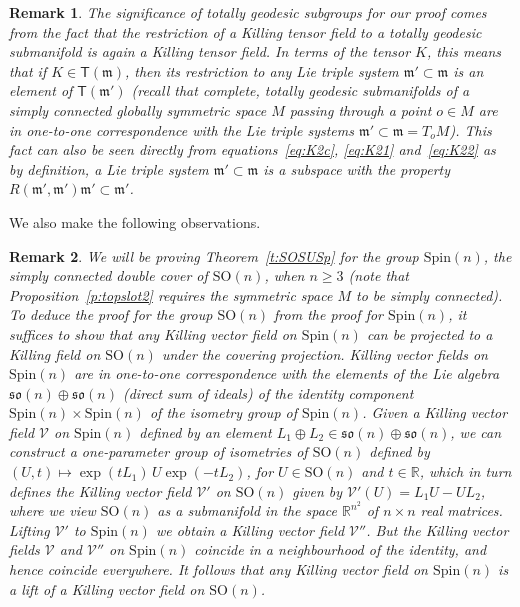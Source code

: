 \documentclass[10pt,a4paper]{amsart}
\newcommand \br{\mathbb{R}}
\newcommand \SO{\mathrm{SO}}
\newcommand \Spin{\mathrm{Spin}}
\newcommand \cV{\mathcal{V}}
\newcommand \sT{\mathsf{T}}
\newcommand\m{\mathfrak m}
\newcommand \so{\mathfrak{so}}
\newcommand \<{\langle}
\renewcommand \>{\rangle}
\newtheorem{remark}{Remark}
\begin{document}
	\begin{remark} \label{rem:lts}
		The significance of totally geodesic subgroups for our proof comes from the fact that the restriction of a Killing tensor field to a totally geodesic submanifold is again a Killing tensor field. In terms of the tensor $K$, this means that if $K \in \sT(\m)$, then its restriction to any Lie triple system $\m' \subset \m$ is an element of $\sT(\m')$ (recall that complete, totally geodesic submanifolds of a simply connected globally symmetric space $M$ passing through a point $o \in M$ are in one-to-one correspondence with the Lie triple systems $\m' \subset \m = T_oM$). This fact can also be seen directly from equations~\eqref{eq:K2c}, \eqref{eq:K21} and~\eqref{eq:K22} as by definition, a Lie triple system $\m' \subset \m$ is a subspace with the property $R(\m',\m')\m' \subset \m'$.
	\end{remark}
	
We also make the following observations.
	
	\begin{remark} \label{rem:spintoso}
		We will be proving Theorem~\ref{t:SOSUSp} for the group $\Spin(n)$, the simply connected double cover of $\SO(n)$, when $n \ge 3$ (note that Proposition~\ref{p:topslot2} requires the symmetric space $M$ to be simply connected). To deduce the proof for the group $\SO(n)$ from the proof for $\Spin(n)$, it suffices to show that any Killing vector field on $\Spin(n)$ can be projected to a Killing field on $\SO(n)$ under the covering projection. Killing vector fields on $\Spin(n)$ are in one-to-one correspondence with the elements of the Lie algebra $\so(n) \oplus \so(n)$ (direct sum of ideals) of the identity component $\Spin(n) \times \Spin(n)$ of the isometry group of $\Spin(n)$. Given a Killing vector field $\cV$ on $\Spin(n)$ defined by an element $L_1 \oplus L_2 \in \so(n) \oplus \so(n)$, we can construct a one-parameter group of isometries of $\SO(n)$ defined by $(U,t) \mapsto \exp(tL_1) \, U \exp(-tL_2)$, for $U \in \SO(n)$ and $t \in \br$, which in turn defines the Killing vector field $\cV'$ on $\SO(n)$ given by $\cV'(U) = L_1U - UL_2$, where we view $\SO(n)$ as a submanifold in the space $\br^{n^2}$ of $n \times n$ real matrices. Lifting $\cV'$ to $\Spin(n)$ we obtain a Killing vector field $\cV''$. But the Killing vector fields $\cV$ and $\cV''$ on $\Spin(n)$ coincide in a neighbourhood of the identity, and hence coincide everywhere. It follows that any Killing vector field on $\Spin(n)$ is a lift of a Killing vector field on $\SO(n)$.
	\end{remark}
\end{document}
